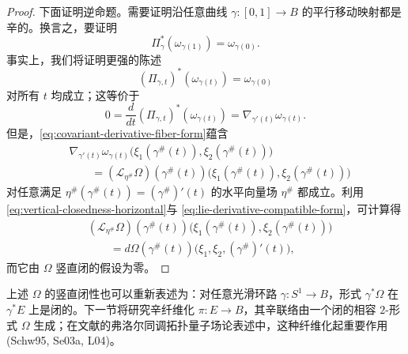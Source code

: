 \begin{proof}
下面证明逆命题。需要证明沿任意曲线 $\gamma:[0,1]\to B$ 的平行移动映射都是辛的。换言之，要证明
\[
 \Pi_\gamma^*(\omega_{\gamma(1)})=\omega_{\gamma(0)}.
\]
事实上，我们将证明更强的陈述
\[
 (\Pi_{\gamma,t})^*(\omega_{\gamma(t)})=\omega_{\gamma(0)}
\]
对所有 $t$ 均成立；这等价于
\[
 0=\frac d{dt}(\Pi_{\gamma,t})^*(\omega_{\gamma(t)})
  =\nabla_{\gamma'(t)}\omega_{\gamma(t)}.
\]
但是，\eqref{eq:covariant-derivative-fiber-form}蕴含
\[
\begin{aligned}
 &\nabla_{\gamma'(t)}\omega_{\gamma(t)}
   \bigl(\xi_1(\gamma^\#(t)),\xi_2(\gamma^\#(t))\bigr)\\
 &\qquad={}
 (\mathcal L_{\eta^\#}\Omega)(\gamma^\#(t))
   \bigl(\xi_1(\gamma^\#(t)),\xi_2(\gamma^\#(t))\bigr)
\end{aligned}
\]
对任意满足
$\eta^\#(\gamma^\#(t))=(\gamma^\#)'(t)$ 的水平向量场 $\eta^\#$ 都成立。利用\eqref{eq:vertical-closedness-horizontal}与
\eqref{eq:lie-derivative-compatible-form}，可计算得
\[
\begin{aligned}
 &(\mathcal L_{\eta^\#}\Omega)(\gamma^\#(t))
   \bigl(\xi_1(\gamma^\#(t)),\xi_2(\gamma^\#(t))\bigr)\\
 &\qquad={}
 d\Omega(\gamma^\#(t))
   \bigl(\xi_1,\xi_2,(\gamma^\#)'(t)\bigr),
\end{aligned}
\]
而它由 $\Omega$ 竖直闭的假设为零。
\end{proof}

上述 $\Omega$ 的竖直闭性也可以重新表述为：对任意光滑环路
$\gamma:S^1\to B$，形式 $\gamma^*\Omega$ 在 $\gamma^*E$ 上是闭的。下一节将研究辛纤维化 $\pi:E\to B$，其辛联络由一个闭的相容 $2$-形式
$\Omega$ 生成；在文献的弗洛尔同调拓扑量子场论表述中，这种纤维化起重要作用 (Schw95, Se03a, L04)。
